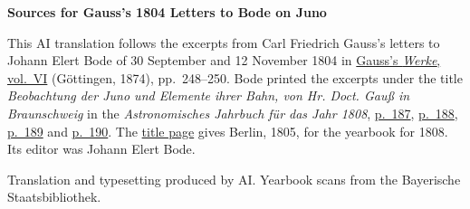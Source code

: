 \clearpage\thispagestyle{empty}
\begin{center}\textbf{Sources for Gauss’s 1804 Letters to Bode on Juno}\end{center}
\noindent This AI translation follows the excerpts from Carl Friedrich Gauss’s letters to Johann Elert Bode of 30 September and 12 November 1804 in \href{https://gdz.sub.uni-goettingen.de/id/PPN236007467}{Gauss’s \textit{Werke}, vol.~VI} (Göttingen, 1874), pp.~248--250. Bode printed the excerpts under the title \textit{Beobachtung der Juno und Elemente ihrer Bahn, von Hr. Doct. Gauß in Braunschweig} in the \textit{Astronomisches Jahrbuch für das Jahr 1808}, \href{https://www.digitale-sammlungen.de/en/view/bsb10538337?page=197}{p.~187}, \href{https://www.digitale-sammlungen.de/en/view/bsb10538337?page=198}{p.~188}, \href{https://www.digitale-sammlungen.de/en/view/bsb10538337?page=199}{p.~189} and \href{https://www.digitale-sammlungen.de/en/view/bsb10538337?page=200}{p.~190}. The \href{https://www.digitale-sammlungen.de/en/view/bsb10538337?page=7}{title page} gives Berlin, 1805, for the yearbook for 1808. Its editor was Johann Elert Bode.
\par\smallskip\noindent Translation and typesetting produced by AI. Yearbook scans from the Bayerische Staatsbibliothek.
\clearpage
